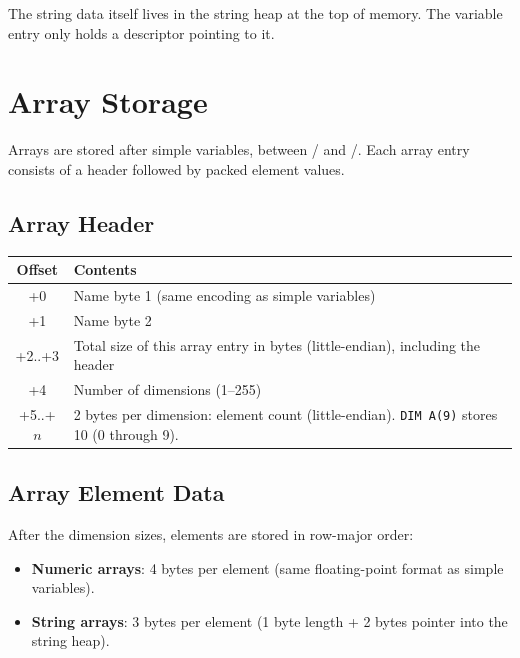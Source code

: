 The string data itself lives in the string heap at the top of memory.  The
variable entry only holds a descriptor pointing to it.

\section{Array Storage}

Arrays are stored after simple variables, between / and
/.  Each array entry consists of a header followed by
packed element values.

\subsection{Array Header}

\begin{center}
\begin{tabular}{cl}
\toprule
\textbf{Offset} & \textbf{Contents} \\
\midrule
+0 & Name byte 1 (same encoding as simple variables) \\
+1 & Name byte 2 \\
+2..+3 & Total size of this array entry in bytes (little-endian),
         including the header \\
+4 & Number of dimensions (1--255) \\
+5..+$n$ & 2 bytes per dimension: element count (little-endian).
           \texttt{DIM A(9)} stores 10 (0 through 9). \\
\bottomrule
\end{tabular}
\end{center}

\subsection{Array Element Data}

After the dimension sizes, elements are stored in row-major order:

\begin{itemize}
  \item \textbf{Numeric arrays}: 4 bytes per element (same floating-point
        format as simple variables).
  \item \textbf{String arrays}: 3 bytes per element (1 byte length + 2 bytes
        pointer into the string heap).
\end{itemize}

